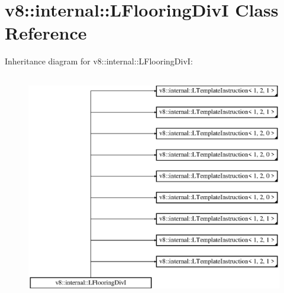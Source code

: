 \hypertarget{classv8_1_1internal_1_1_l_flooring_div_i}{}\section{v8\+:\+:internal\+:\+:L\+Flooring\+DivI Class Reference}
\label{classv8_1_1internal_1_1_l_flooring_div_i}
Inheritance diagram for v8\+:\+:internal\+:\+:L\+Flooring\+DivI\+:\begin{figure}[H]
\begin{center}
\leavevmode
\includegraphics[height=10.000000cm]{classv8_1_1internal_1_1_l_flooring_div_i}
\end{center}
\end{figure}
